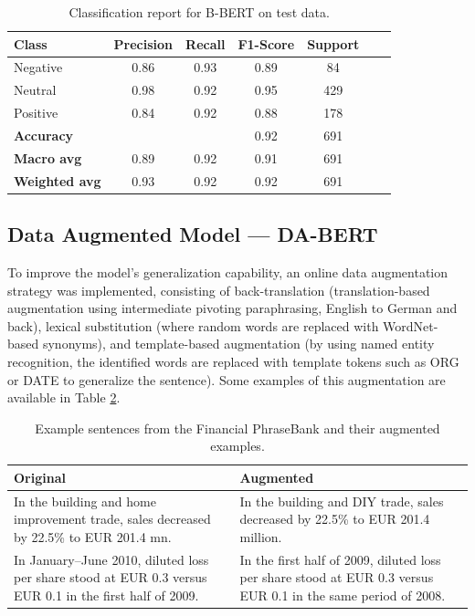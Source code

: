 \documentclass[conference]{IEEEtran}
\begin{document}
\begin{table}[H]
\centering
\caption{Classification report for B-BERT on test data.}
\label{cr_basebert_test}
\begin{tabular}{lcccccc}
\toprule
\textbf{Class} & \textbf{Precision} & \textbf{Recall} & \textbf{F1-Score} & \textbf{Support} \\
\midrule
Negative & 0.86 & 0.93 & 0.89 & 84 \\
Neutral & 0.98 & 0.92 & 0.95 & 429 \\
Positive & 0.84 & 0.92 & 0.88 & 178 \\
\midrule
\textbf{Accuracy} &  &  & 0.92 & 691 \\
\textbf{Macro avg} & 0.89 & 0.92 & 0.91 & 691 \\
\textbf{Weighted avg} & 0.93 & 0.92 & 0.92 & 691 \\
\bottomrule
\end{tabular}
\end{table}

\subsection{Data Augmented Model — DA-BERT}

To improve the model's generalization capability, an online data augmentation strategy was implemented, consisting of back-translation (translation-based augmentation using intermediate pivoting paraphrasing, English to German and back), lexical substitution (where random words are replaced with WordNet-based synonyms), and template-based augmentation (by using named entity recognition, the identified words are replaced with template tokens such as ORG or DATE to generalize the sentence). Some examples of this augmentation are available in Table \ref{tab:fpb_augm_examples}.

\begin{table}[ht]
\centering
\caption{Example sentences from the Financial PhraseBank and their augmented examples.}
\label{tab:fpb_augm_examples}
\begin{tabular}{p{3.5cm}p{3.5cm}}
\toprule
\textbf{Original} & \textbf{Augmented} \\
\midrule
In the building and home improvement trade, sales decreased by 22.5\% to EUR 201.4 mn. & In the building and DIY trade, sales decreased by 22.5\% to EUR 201.4 million. \\
In January–June 2010, diluted loss per share stood at EUR 0.3 versus EUR 0.1 in the first half of 2009. & In the first half of 2009, diluted loss per share stood at EUR 0.3 versus EUR 0.1 in the same period of 2008. \\
\bottomrule
\end{tabular}
\end{table}
\end{document}
